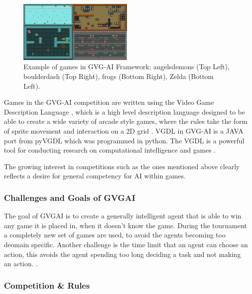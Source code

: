\documentclass[journal]{IEEEtran}
\begin{document}
		\begin{figure}[h]
		    \centering
		    \includegraphics[width=0.5\textwidth]{VGDL2}
		    \caption{Example of games in GVG-AI Framework: angelsdemons (Top Left), boulderdash (Top Right), frogs (Bottom Right), Zelda (Bottom Left). }
		    \label{fig:VGDL}
		\end{figure}
		Games in the GVG-AI competition are written using the Video Game Description Language \cite{schaul2014extensible}, which is a high level description language designed to be able to create a wide variety of arcade style games, where the rules take the form of sprite movement and interaction on a 2D grid \cite{nelson2016investigating}.
		VGDL in GVG-AI is a JAVA port from pyVGDL which was programmed in python. The VGDL is a powerful tool for conducting research on computational intelligence and games \cite{schaul2014extensible, love2008general}.
		
		The growing interest in competitions such as the ones mentioned above clearly reflects a desire for general competency for AI within games.

	\subsubsection{Challenges and Goals of GVGAI}
		The goal of GVGAI is to create a generally intelligent agent that is able to win any game it is placed in, when it doesn't know the game.
		During the tournament a completely new set of games are used, to avoid the agents becoming too deomain specific.
		Another challenge is the time limit that an agent can choose an action, this avoids the agent spending too long deciding a task and not making an action. \cite{schuster2015mcts}.
		
		
	\subsubsection{Competition \& Rules}
	
\end{document}

